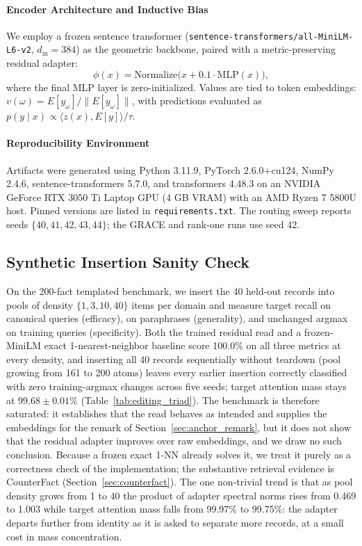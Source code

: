 \documentclass[preprint,12pt]{elsarticle}
\begin{document}
\paragraph{Encoder Architecture and Inductive Bias}
We employ a frozen sentence transformer (\texttt{sentence-transformers/all-MiniLM-L6-v2}, $d_{\mathrm{in}} = 384$) as the geometric backbone, paired with a metric-preserving residual adapter:
\[
  \phi(x) = \mathrm{Normalize}\big( x + 0.1 \cdot \mathrm{MLP}(x) \big),
\]
where the final MLP layer is zero-initialized. Values are tied to token embeddings: $v(\omega) = E[y_\omega] / \|E[y_\omega]\|$, with predictions evaluated as $p(y \mid x) \propto \langle z(x), E[y] \rangle / \tau$.

\paragraph{Reproducibility Environment}
Artifacts were generated using Python 3.11.9, PyTorch 2.6.0+cu124, NumPy 2.4.6, sentence-transformers 5.7.0, and transformers 4.48.3 on an NVIDIA GeForce RTX 3050 Ti Laptop GPU (4 GB VRAM) with an AMD Ryzen 7 5800U host. Pinned versions are listed in \texttt{requirements.txt}. The routing sweep reports seeds $\{40,41,42,43,44\}$; the GRACE and rank-one runs use seed 42.

\subsection{Synthetic Insertion Sanity Check}
\label{sec:synthetic_insertion}

On the 200-fact templated benchmark, we insert the 40 held-out records into pools of density $\{1,3,10,40\}$ items per domain and measure target recall on canonical queries (efficacy), on paraphrases (generality), and unchanged argmax on training queries (specificity). Both the trained residual read and a frozen-MiniLM exact 1-nearest-neighbor baseline score 100.0\% on all three metrics at every density, and inserting all 40 records sequentially without teardown (pool growing from 161 to 200 atoms) leaves every earlier insertion correctly classified with zero training-argmax changes across five seeds; target attention mass stays at $99.68\pm0.01\%$ (Table~\ref{tab:editing_triad}). The benchmark is therefore saturated: it establishes that the read behaves as intended and supplies the embeddings for the remark of Section~\ref{sec:anchor_remark}, but it does not show that the residual adapter improves over raw embeddings, and we draw no such conclusion. Because a frozen exact 1-NN already solves it, we treat it purely as a correctness check of the implementation; the substantive retrieval evidence is CounterFact (Section~\ref{sec:counterfact}). The one non-trivial trend is that as pool density grows from 1 to 40 the product of adapter spectral norms rises from 0.469 to 1.003 while target attention mass falls from 99.97\% to 99.75\%: the adapter departs further from identity as it is asked to separate more records, at a small cost in mass concentration.
\end{document}

